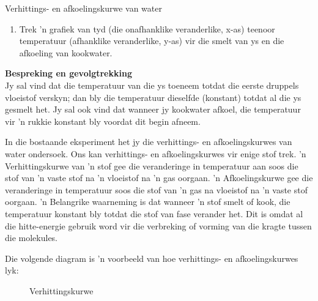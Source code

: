 \begin{f_experiment}{Verhittings- en afkoelingskurwe van water}
{\begin{enumerate}[noitemsep, label=\textbf{\arabic*}.]
\begin{table}[H]
\begin{center}
\begin{tabular}{|l|l|l|l|}
    \end{tabular}
      \end{center}
\end{table}
\item Trek 'n grafiek van tyd (die onafhanklike veranderlike, x-as) teenoor temperatuur (afhanklike veranderlike, y-as) vir die smelt van ys en die afkoeling van kookwater.
\end{enumerate}
\par   
\label{m38736*eip-864}\noindent{}\textbf{Bespreking en gevolgtrekking}\\
Jy sal vind dat die temperatuur van die ys toeneem totdat die eerste druppels vloeistof
verskyn; dan bly die temperatuur dieselfde (konstant) totdat al die ys gesmelt het. Jy sal ook
vind dat wanneer jy kookwater afkoel, die temperatuur vir 'n rukkie konstant bly voordat dit
begin afneem.}
\end{f_experiment} 
\par \label{m38736*eip-25}In die bostaande eksperiment het jy die verhittings- en afkoelingskurwes van water ondersoek. Ons kan
verhittings- en afkoelingskurwes vir enige stof trek. 'n Verhittingskurwe van 'n stof gee die veranderinge
in temperatuur aan soos die stof van 'n vaste stof na 'n vloeistof na 'n gas oorgaan. 'n Afkoelingskurwe gee
die veranderinge in temperatuur soos die stof van  'n gas na vloeistof na 'n vaste stof oorgaan. 'n Belangrike
waarneming is dat wanneer 'n stof smelt of kook, die temperatuur konstant bly totdat die stof van fase verander
het. Dit is omdat al die hitte-energie gebruik word vir die verbreking of vorming van die kragte tussen die molekules.  \par 
Die volgende diagram is 'n voorbeeld van hoe verhittings- en afkoelingskurwes lyk: \par
\begin{minipage}{0.5\textwidth}
\begin{figure}[H]
 \begin{center}
\end{center}
\caption{Verhittingskurwe}
\end{figure}
\end{minipage}
